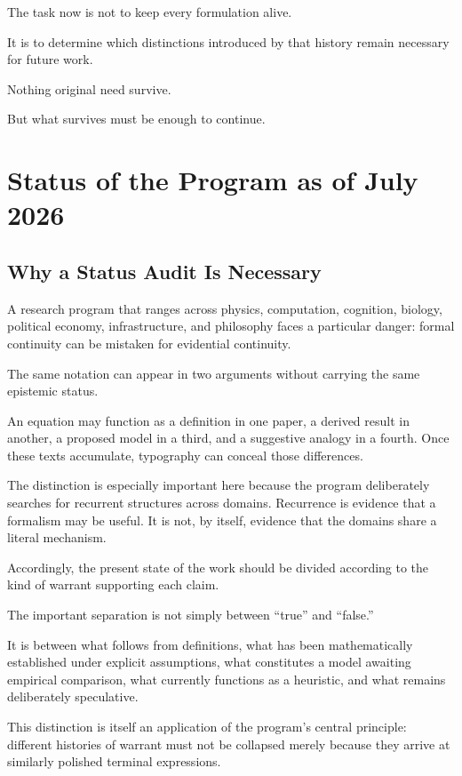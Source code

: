 \documentclass[11pt]{article}
\theoremstyle{remark}
\begin{document}
The task now is not to keep every formulation alive.

It is to determine which distinctions introduced by that history remain necessary for future work.

Nothing original need survive.

But what survives must be enough to continue.

\section{Status of the Program as of July 2026}

\subsection{Why a Status Audit Is Necessary}

A research program that ranges across physics, computation, cognition, biology,
political economy, infrastructure, and philosophy faces a particular danger:
formal continuity can be mistaken for evidential continuity.

The same notation can appear in two arguments without carrying the same
epistemic status.

An equation may function as a definition in one paper, a derived result in
another, a proposed model in a third, and a suggestive analogy in a fourth.
Once these texts accumulate, typography can conceal those differences.

The distinction is especially important here because the program deliberately
searches for recurrent structures across domains. Recurrence is evidence that a
formalism may be useful. It is not, by itself, evidence that the domains share a
literal mechanism.

Accordingly, the present state of the work should be divided according to the
kind of warrant supporting each claim.

The important separation is not simply between ``true'' and ``false.''

It is between what follows from definitions, what has been mathematically
established under explicit assumptions, what constitutes a model awaiting
empirical comparison, what currently functions as a heuristic, and what remains
deliberately speculative.

This distinction is itself an application of the program's central principle:
different histories of warrant must not be collapsed merely because they arrive
at similarly polished terminal expressions.
\end{document}
